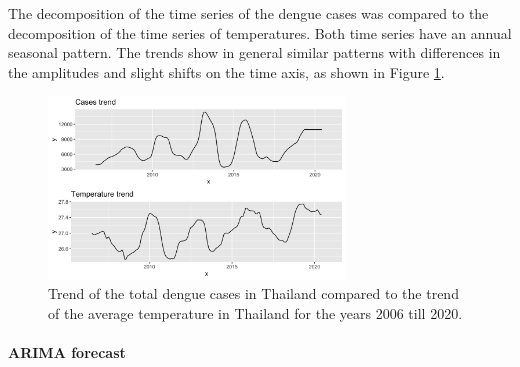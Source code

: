 	The decomposition of the time series of the dengue cases was compared to the decomposition of the time series of temperatures. Both time series have an annual seasonal pattern. The trends show in general similar patterns with differences in the amplitudes and slight shifts on the time axis, as shown in Figure \ref{fig:Trend_temp_cases}.
	\begin{figure}[hbpt] 
		\centering
		\includegraphics[width=0.7\textwidth]{fig/Trend_temp_cases.png}
		\caption{Trend of the total dengue cases in Thailand compared to the trend of the average temperature in Thailand for the years 2006 till 2020.}
		\label{fig:Trend_temp_cases}
	\end{figure}
	
	\paragraph{ARIMA forecast}
	
	